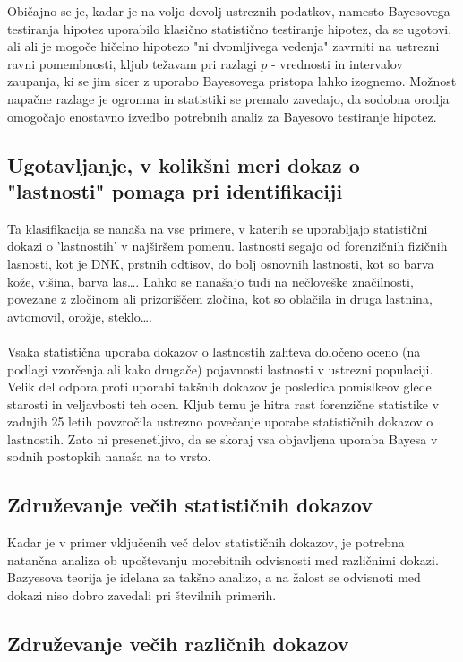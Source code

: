 \documentclass[a4paper,12pt]{article}
\begin{document}
Običajno se je, kadar je na voljo dovolj ustreznih podatkov, namesto Bayesovega testiranja hipotez uporabilo klasično statistično testiranje hipotez, da se ugotovi, ali 
ali je mogoče hičelno hipotezo "ni dvomljivega vedenja" zavrniti na ustrezni ravni pomembnosti, kljub težavam pri razlagi $p$ - vrednosti in intervalov zaupanja, ki se jim 
sicer z uporabo Bayesovega pristopa lahko izognemo. Možnost napačne razlage je ogromna in statistiki se premalo zavedajo, da sodobna orodja omogočajo enostavno izvedbo 
potrebnih analiz za Bayesovo testiranje hipotez.

\subsection{Ugotavljanje, v kolikšni meri dokaz o "lastnosti" pomaga pri identifikaciji}
Ta klasifikacija se nanaša na vse primere, v katerih se uporabljajo statistični dokazi o 'lastnostih' v najširšem pomenu. lastnosti segajo od forenzičnih fizičnih lasnosti, 
kot je DNK, prstnih odtisov, do bolj osnovnih lastnosti, kot so barva kože, višina, barva las\dots. Lahko se nanašajo tudi na nečloveške značilnosti, povezane z zločinom ali 
prizoriščem zločina, kot so oblačila in druga lastnina, avtomovil, orožje, steklo\dots. \\
\\
Vsaka statistična uporaba dokazov o lastnostih zahteva določeno oceno (na podlagi vzorčenja ali kako drugače) pojavnosti lastnosti v ustrezni populaciji. Velik del odpora proti 
uporabi takšnih dokazov je posledica pomislkeov glede starosti in veljavbosti teh ocen. Kljub temu je hitra rast forenzične statistike v zadnjih 25 letih povzročila ustrezno povečanje 
uporabe statističnih dokazov o lastnostih. Zato ni presenetljivo, da se skoraj vsa objavljena uporaba Bayesa v sodnih postopkih nanaša na to vrsto.

\subsection{Združevanje večih statističnih dokazov}
Kadar je v primer vključenih več delov statističnih dokazov, je potrebna natančna analiza ob upoštevanju morebitnih odvisnosti med različnimi dokazi. Bazyesova teorija je idelana za 
takšno analizo, a na žalost se odvisnoti med dokazi niso dobro zavedali pri številnih primerih. 

\subsection{Združevanje večih različnih dokazov}
\end{document}
